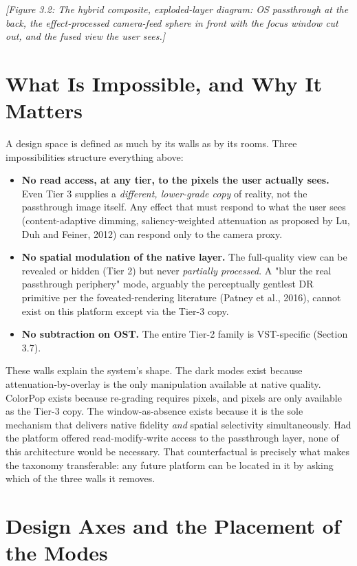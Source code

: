 \textit{[Figure 3.2: The hybrid composite, exploded-layer diagram: OS passthrough at the back, the
effect-processed camera-feed sphere in front with the focus window cut out, and the fused view the
user sees.]}

\section{What Is Impossible, and Why It Matters}

A design space is defined as much by its walls as by its rooms. Three impossibilities structure
everything above:

\begin{itemize}
\item \textbf{No read access, at any tier, to the pixels the user actually sees.} Even Tier 3 supplies a
\textit{different, lower-grade copy} of reality, not the passthrough image itself. Any effect that must
respond to what the user sees (content-adaptive dimming, saliency-weighted attenuation as proposed
by Lu, Duh and Feiner, 2012) can respond only to the camera proxy.
\item \textbf{No spatial modulation of the native layer.} The full-quality view can be revealed or hidden
(Tier 2) but never \textit{partially processed}. A "blur the real passthrough periphery" mode, arguably
the perceptually gentlest DR primitive per the foveated-rendering literature (Patney et al., 2016),
cannot exist on this platform except via the Tier-3 copy.
\item \textbf{No subtraction on OST.} The entire Tier-2 family is VST-specific (Section 3.7).
\end{itemize}

These walls explain the system's shape. The dark modes exist because attenuation-by-overlay is the
only manipulation available at native quality. ColorPop exists because re-grading requires pixels,
and pixels are only available as the Tier-3 copy. The window-as-absence exists because it is the sole
mechanism that delivers native fidelity \textit{and} spatial selectivity simultaneously. Had the platform
offered read-modify-write access to the passthrough layer, none of this architecture would be
necessary. That counterfactual is precisely what makes the taxonomy transferable: any future
platform can be located in it by asking which of the three walls it removes.

\section{Design Axes and the Placement of the Modes}

